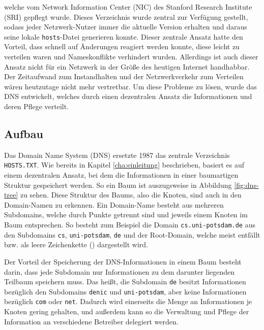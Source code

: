\documentclass[a4paper, 12pt, BCOR10mm, DIV12, toc=bibliography, toc=listof, german]{scrbook}
\def \dns {Domain Name System (DNS)}
\begin{document}
			welche vom Network Information Center (NIC) des Stanford Research Institute (SRI) gepflegt
			wurde. Dieses Verzeichnis wurde zentral zur Verfügung gestellt, sodass jeder Netzwerk-Nutzer
			immer die aktuelle Version erhalten und daraus seine lokale \texttt{hosts}-Datei generieren
			konnte.  Dieser zentrale Ansatz hatte den Vorteil, dass schnell auf Änderungen reagiert werden
			konnte, diese leicht zu verteilen waren und Nameskonflikte verhindert wurden.  Allerdings ist
			auch dieser Ansatz nicht für ein Netzwerk in der Größe des heutigen Internet handhabbar.  Der
			Zeitaufwand zum Instandhalten und der Netzwerkverkehr zum Verteilen wären heutzutage nicht
			mehr vertretbar. Um diese Probleme zu lösen, wurde das DNS \cite{rfc1034} entwickelt, welches
			durch einen dezentralen Ansatz die Informationen und deren Pflege verteilt.

			


			\subsection{Aufbau} %
			\label{sub:aufbau}

			Das \dns{} ersetzte 1987 das zentrale Verzeichnis \texttt{HOSTS.TXT}. Wie bereits in Kapitel
			\ref{cha:einleitung} beschrieben, basiert es auf einem dezentralen Ansatz, bei dem die
			Informationen in einer baumartigen Struktur gespeichert werden. So ein Baum ist auszugsweise
			in Abbildung \ref{fig:dns-tree} zu sehen. Diese Struktur des Baums, also die Knoten, sind auch
			in den Domain-Namen zu erkennen. Ein Domain-Name besteht aus mehreren Subdomains, welche durch
			Punkte getrennt sind und jeweils einem Knoten im Baum entsprechen. So besteht zum Beispiel die
			Domain \texttt{cs.uni-potsdam.de} aus den Subdomains \texttt{cs}, \texttt{uni-potsdam},
			\texttt{de} und der Root-Domain, welche meist entfällt bzw. als leere Zeichenkette
			(\glqq{}\grqq{}) dargestellt wird.

			Der Vorteil der Speicherung der DNS-Informationen in einem Baum besteht darin, dass jede Subdomain
			nur Informationen zu dem darunter liegenden Teilbaum speichern muss. Das heißt, die Subdomain
			\texttt{de} besitzt Informationen bezüglich den Subdomains \texttt{denic} und
			\texttt{uni-potsdam}, aber keine Informationen bezüglich \texttt{com} oder \texttt{net}.
			Dadurch wird einerseits die Menge an Informationen je Knoten gering gehalten, und außerdem
			kann so die Verwaltung und Pflege der Information an verschiedene Betreiber delegiert werden.
\end{document}
